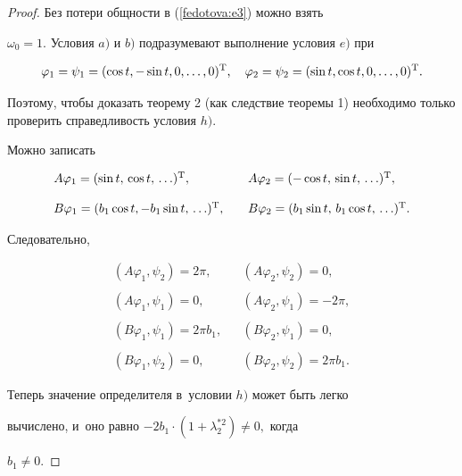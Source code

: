 \begin{proof}

Без потери общности в (\ref{fedotova:e3}) можно взять

$\omega_0=1.$ Условия $a)$ и $b)$ подразумевают выполнение условия $e)$ при

$$

\varphi_1=\psi_1=(\cos t, -\sin t, 0, \ldots, 0)^{\rm T},\quad

\varphi_2=\psi_2=(\sin t, \cos t, 0, \ldots, 0)^{\rm T}.

$$

Поэтому, чтобы доказать теорему 2 (как следствие теоремы 1) необходимо только проверить справедливость условия $h)$.



Можно записать 

$$

\begin{array}{lll}

A\varphi_1 =(\sin t,\,\cos t,\,\ldots)^{\rm T}, && A\varphi_2=(-\cos

t,\,\sin t,\,\ldots)^{\rm T},\\ \\

B\varphi_1=(b_1\cos t, -b_1\sin t,\,\ldots)^{\rm T}, &&

B\varphi_2=(b_1\sin t,\,b_1\cos t,\,\ldots)^{\rm T}.

\end{array}

$$

Следовательно,

$$

\begin{array}{lllllll}

(A\varphi_1, \psi_2)=2\pi, && (A\varphi_2, \psi_2)=0,\\ \\

(A\varphi_1, \psi_1)=0, && (A\varphi_2, \psi_1)=-2\pi,\\ \\

(B\varphi_1, \psi_1)=2\pi b_1, && (B\varphi_2, \psi_1)=0,\\ \\

(B\varphi_1, \psi_2)=0, && (B\varphi_2, \psi_2)=2\pi b_1.

\end{array}

$$

Теперь значение определителя в~условии $h)$ может быть легко

вычислено, и~оно равно $-2b_1\cdot(1+\lambda_2^{*2})\neq0,$ когда

$b_1\neq0.$

\end{proof}



